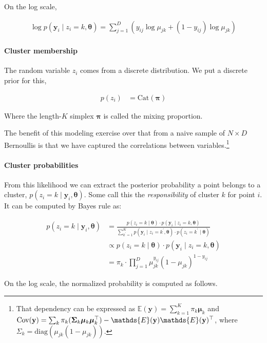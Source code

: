 \documentclass[12pt,letterpaper]{article}
\numberwithin{equation}{section}
\newcommand{\cov}{\textnormal{Cov}}
\newcommand{\bth}{\bm{\theta}}
\newcommand{\bmu}{\bm{\mu}}
\newcommand{\bpi}{\bm{\pi}}
\newcommand{\by}{\mathbf{y}}
\begin{document}
On the log scale,

\begin{align}
\log p(\by_{i} \mid z_{i} = k, \bth) = \sum_{j=1}^{D}(y_{ij}\log\mu_{jk} + (1 - y_{ij})\log\mu_{jk})
\end{align}

\paragraph{Cluster membership}

The random variable \(z_i\) comes from a discrete distribution. We put a
discrete prior for this,

\begin{align}
p(z_i) &= \text{Cat}(\bpi)
\end{align}

Where the length-\(K\) simplex \(\bpi\) is called the mixing proportion.

The benefit of this modeling exercise over that from a naive sample of
\(N \times D\) Bernoullis is that we have captured the correlations
between
variables.\footnote{That dependency can be expressed as \(\mathds{E}(\by) = \sum_{k = 1}^{K} \pi_{k} \bmu_{k}\) and 
\(\cov({\by}) = \sum_{k} \pi_{k} (\mathbf{\Sigma}_k \bmu_k\bmu_{k}^{\top}) - \mathds{E}(\by)\mathds{E}(\by)^\top\), where \(\Sigma_k = \text{diag}(\mu_{jk}(1 - \mu_{jk}))\).}

\paragraph{Cluster probabilities}

From this likelihood we can extract the posterior probability a point
belongs to a cluster, \(p(z_i = k \mid \by_i, \bth)\). Some call this
the \emph{responsibility} of cluster \(k\) for point \(i\). It can be
computed by Bayes rule as:

\begin{align}
p(z_i = k \mid \by_{i}, \bth) &=  \frac{p(z_i = k \mid \bth)\cdot p(\by_{i} \mid z_i = k, \bth)}{\sum^{K}_{k^\prime = 1} p(\by_{i} \mid z_i = k^\prime, \bth) \cdot p(z_i = k^\prime \mid \bth)}\\
&\propto p(z_i = k \mid \bth)\cdot p(\by_{i} \mid z_i = k, \bth)\\
&=  \pi_k\cdot\prod^{D}_{j=1}\mu_{jk}^{y_{ij}}(1 - \mu_{jk})^{1 - y_{ij}}
\end{align}

On the log scale, the normalized probability is computed as follows.
\end{document}
